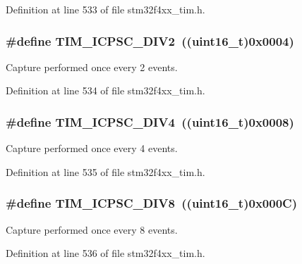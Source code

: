 Definition at line 533 of file stm32f4xx\-\_\-tim.\-h.

\hypertarget{group___t_i_m___input___capture___prescaler_ga1d8a7b66add914e2ddd910d2d700978f}{
\subsubsection[{T\-I\-M\-\_\-\-I\-C\-P\-S\-C\-\_\-\-D\-I\-V2}]{\setlength{\rightskip}{0pt plus 5cm}\#define T\-I\-M\-\_\-\-I\-C\-P\-S\-C\-\_\-\-D\-I\-V2~((uint16\-\_\-t)0x0004)}}\label{group___t_i_m___input___capture___prescaler_ga1d8a7b66add914e2ddd910d2d700978f}
Capture performed once every 2 events. 

Definition at line 534 of file stm32f4xx\-\_\-tim.\-h.

\hypertarget{group___t_i_m___input___capture___prescaler_gaf5a675046430fa0f0c95b0dac612828f}{
\subsubsection[{T\-I\-M\-\_\-\-I\-C\-P\-S\-C\-\_\-\-D\-I\-V4}]{\setlength{\rightskip}{0pt plus 5cm}\#define T\-I\-M\-\_\-\-I\-C\-P\-S\-C\-\_\-\-D\-I\-V4~((uint16\-\_\-t)0x0008)}}\label{group___t_i_m___input___capture___prescaler_gaf5a675046430fa0f0c95b0dac612828f}
Capture performed once every 4 events. 

Definition at line 535 of file stm32f4xx\-\_\-tim.\-h.

\hypertarget{group___t_i_m___input___capture___prescaler_ga5086cb03c89a5c67b199d20b605f00cb}{
\subsubsection[{T\-I\-M\-\_\-\-I\-C\-P\-S\-C\-\_\-\-D\-I\-V8}]{\setlength{\rightskip}{0pt plus 5cm}\#define T\-I\-M\-\_\-\-I\-C\-P\-S\-C\-\_\-\-D\-I\-V8~((uint16\-\_\-t)0x000\-C)}}\label{group___t_i_m___input___capture___prescaler_ga5086cb03c89a5c67b199d20b605f00cb}
Capture performed once every 8 events. 

Definition at line 536 of file stm32f4xx\-\_\-tim.\-h.

